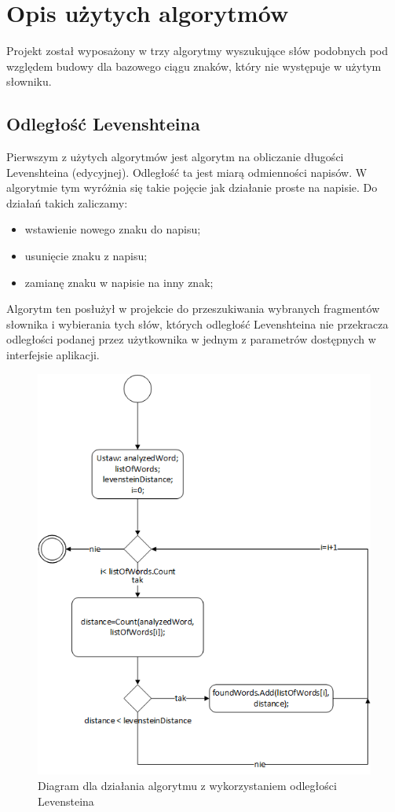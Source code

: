 \chapter{Opis użytych algorytmów}
Projekt został wyposażony w trzy algorytmy wyszukujące słów podobnych pod względem budowy dla bazowego ciągu znaków, który nie występuje w użytym słowniku. 

\section{Odległość Levenshteina} \label{chap:Lev}
Pierwszym z użytych algorytmów jest algorytm na obliczanie długości Levenshteina (edycyjnej). Odległość ta jest miarą odmienności napisów. W algorytmie tym wyróżnia się takie pojęcie jak działanie proste na napisie. Do działań takich zaliczamy:
\begin{itemize}
	\item wstawienie nowego znaku do napisu;
	\item usunięcie znaku z napisu;
	\item zamianę znaku w napisie na inny znak;
\end{itemize}

Algorytm ten posłużył w projekcie do przeszukiwania wybranych fragmentów słownika i wybierania tych słów, których odległość Levenshteina nie przekracza odległości podanej przez użytkownika w jednym z parametrów dostępnych w interfejsie aplikacji.

\begin{figure} [H]
	\centering
	\includegraphics[width=0.6\linewidth]{rozdzial02/Levenstein1.png}
	\caption{Diagram dla działania algorytmu z wykorzystaniem odległości Levensteina}
	\label{fig:Lev}
\end{figure}

